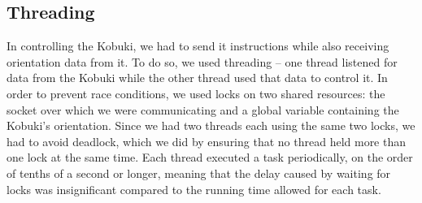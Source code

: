 \documentclass[10pt]{article}
\begin{document}
\begin{multicols*}{2}
  \section*{Threading}
  In controlling the Kobuki, we had to send it instructions while also receiving
  orientation data from it. To do so, we used threading -- one thread listened
  for data from the Kobuki while the other thread used that data to control it.
  In order to prevent race conditions, we used locks on two shared resources:
  the socket over which we were communicating and a global variable containing
  the Kobuki's orientation. Since we had two threads each using the same two
  locks, we had to avoid deadlock, which we did by ensuring that no thread held
  more than one lock at the same time. Each thread executed a task periodically,
  on the order of tenths of a second or longer, meaning that the delay caused by
  waiting for locks was insignificant compared to the running time allowed for
  each task.


\end{multicols*}
\end{document}

